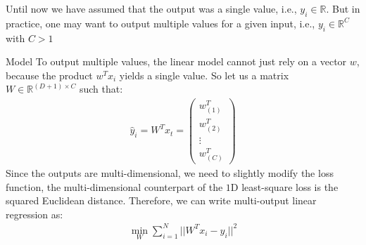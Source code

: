 Until now we have assumed that the output was a single value, i.e., $y_i \in \mathbb{R}$. But in practice, one may want to output multiple values for a given input, i.e., $y_i \in \mathbb{R}^{C}$ with $C > 1$
\begin{parag}{Model}
    To output multiple values, the linear model cannot just rely on a vector $w$, because the product $w^{T}x_i$ yields a single value. So let us a matrix $W \in \mathbb{R}^{\left(D + 1\right) \times C}$ such that:
	\begin{align*} 
		\hat{y}_i = W^{T}x_t = \begin{pmatrix} w_{\left(1\right)}^{T} \\ w_{\left(2\right)}^{T} \\ \vdots \\ w_{\left(C\right)}^{T}  \end{pmatrix} 
	\end{align*}
	Since the outputs are multi-dimensional, we need to slightly modify the loss function, the multi-dimensional counterpart of the $1$D least-square loss is the squared Euclidean distance. Therefore, we can write multi-output linear regression as:
	\begin{align*} 
		\min_W \sum_{i= 1}^{N}||W^{T}x_i - y_i||^2
	\end{align*}
\end{parag}
